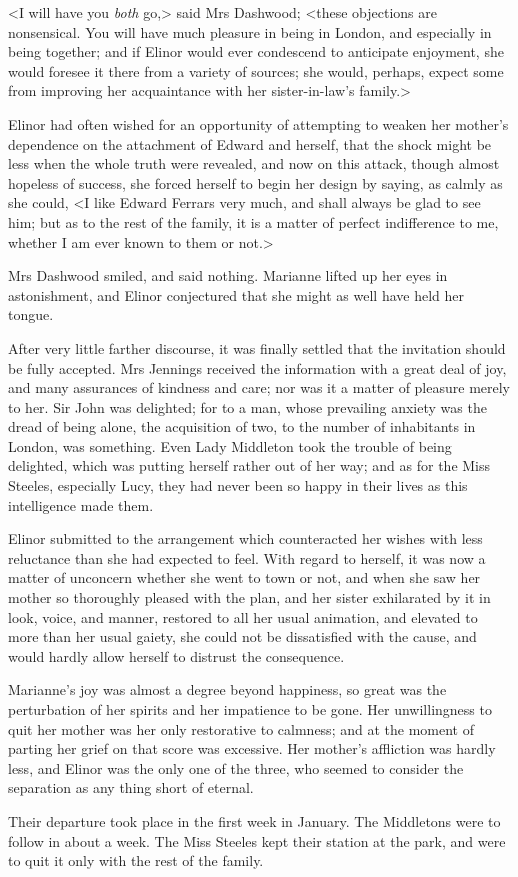 <I will have you \textit{both} go,> said Mrs Dashwood; <these objections are nonsensical. You will have much pleasure in being in London, and especially in being together; and if Elinor would ever condescend to anticipate enjoyment, she would foresee it there from a variety of sources; she would, perhaps, expect some from improving her acquaintance with her sister-in-law's family.>

Elinor had often wished for an opportunity of attempting to weaken her mother's dependence on the attachment of Edward and herself, that the shock might be less when the whole truth were revealed, and now on this attack, though almost hopeless of success, she forced herself to begin her design by saying, as calmly as she could, <I like Edward Ferrars very much, and shall always be glad to see him; but as to the rest of the family, it is a matter of perfect indifference to me, whether I am ever known to them or not.>

Mrs Dashwood smiled, and said nothing. Marianne lifted up her eyes in astonishment, and Elinor conjectured that she might as well have held her tongue.

After very little farther discourse, it was finally settled that the invitation should be fully accepted. Mrs Jennings received the information with a great deal of joy, and many assurances of kindness and care; nor was it a matter of pleasure merely to her. Sir John was delighted; for to a man, whose prevailing anxiety was the dread of being alone, the acquisition of two, to the number of inhabitants in London, was something. Even Lady Middleton took the trouble of being delighted, which was putting herself rather out of her way; and as for the Miss Steeles, especially Lucy, they had never been so happy in their lives as this intelligence made them.

Elinor submitted to the arrangement which counteracted her wishes with less reluctance than she had expected to feel. With regard to herself, it was now a matter of unconcern whether she went to town or not, and when she saw her mother so thoroughly pleased with the plan, and her sister exhilarated by it in look, voice, and manner, restored to all her usual animation, and elevated to more than her usual gaiety, she could not be dissatisfied with the cause, and would hardly allow herself to distrust the consequence.

Marianne's joy was almost a degree beyond happiness, so great was the perturbation of her spirits and her impatience to be gone. Her unwillingness to quit her mother was her only restorative to calmness; and at the moment of parting her grief on that score was excessive. Her mother's affliction was hardly less, and Elinor was the only one of the three, who seemed to consider the separation as any thing short of eternal.

Their departure took place in the first week in January. The Middletons were to follow in about a week. The Miss Steeles kept their station at the park, and were to quit it only with the rest of the family.